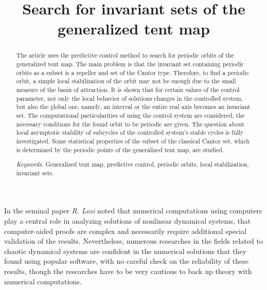 \documentclass[12pt,a4paper]{amsart}
\begin{document}
\title{Search for invariant sets of the generalized tent map}

\begin{abstract}
The article uses the predictive control method to search for periodic orbits of the generalized tent map. The main problem is that 
the invariant set containing periodic orbits as a subset is a repeller and set of the Cantor type. Therefore, to find a periodic orbit, 
a simple local stabilization of the orbit may not be enough due to the small measure of the basin of attraction. It is shown that for 
certain values of the control parameter, not only the local behavior of solutions changes in the controlled system, but also the global 
one, namely, an interval or the entire real axis becomes an invariant set. The computational particularities of using the control system 
are considered, the necessary conditions for the found orbit to be periodic are given. The question about local asymptotic stability of 
subcycles of the controlled system's stable cycles is fully investigated. Some statistical properties of the subset of the classical 
Cantor set, which is determined by the periodic points of the generalized tent map, are studied.

\medskip
\noindent \textit{Keywords.} Generalized tent map, predictive control, periodic orbits, local stabilization, invariant sets.  
\end{abstract}


\maketitle

\section*{}

In the seminal paper \cite{Lozi} \textit{R. Lozi} noted that numerical computations using computers play a central role in analyzing 
solutions of nonlinear dynamical systems, that computer-aided proofs are complex and necessarily require additional special 
validation of the results. Nevertheless, numerous researches in the fields related to chaotic dynamical systems are confident 
in the numerical solutions that they found using popular software, with no careful check on the reliability of these results, though 
the researches have to be very cautious to back up theory with numerical computations.
\end{document}
